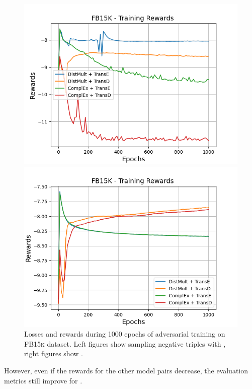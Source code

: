 \begin{figure}[H]
    \begin{minipage}{.5\textwidth}
      \centering
      \includegraphics[width=0.9\linewidth]{figures/results/gan_train/not_pretrained/uncertainty/max/entropy/fb15k/1k_epochs/uncertainty_fb15k_rew.png}
    \end{minipage}%
    \begin{minipage}{.5\textwidth}
      \centering
      \includegraphics[width=0.9\linewidth]{figures/results/gan_train/not_pretrained/uncertainty/max_distribution/entropy/fb15k/1k_epochs/uncertainty_fb15k_rew.png}
    \end{minipage}%
    \caption{Losses and rewards during 1000 epochs of adversarial training on \textsc{FB15k} dataset. 
    Left figures show sampling negative triples with \usmax, right figures show \ussoftmax.}
    \label{fig:advtrain_fb15k_usmax_ussoftmax_losses_rewards}
\end{figure}
However, even if the rewards for the other model pairs decrease, the evaluation metrics still improve for \ussoftmax.